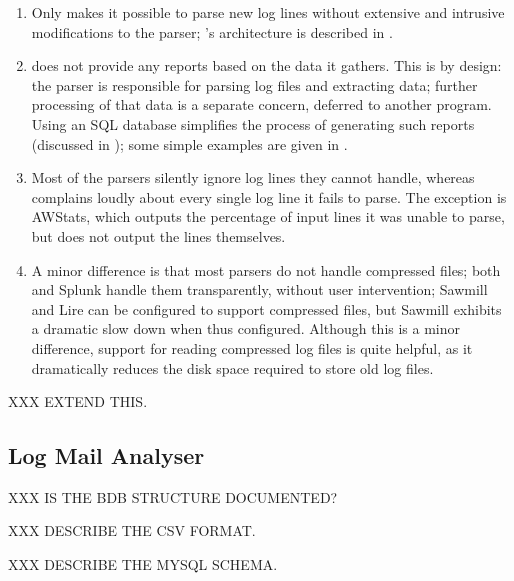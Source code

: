 \begin{enumerate}

    \item Only \parsername{} makes it possible to parse new log lines
        without extensive and intrusive modifications to the parser;
        \parsername{}'s architecture is described in .

    \item \parsername{} does not provide any reports based on the data it
        gathers.  This is by design: the parser is responsible for parsing
        log files and extracting data; further processing of that data is a
        separate concern, deferred to another program.  Using an \gls{SQL}
        database simplifies the process of generating such reports
        (discussed in ); some simple examples
        are given in .

    \item Most of the parsers silently ignore log lines they cannot handle,
        whereas \parsername{} complains loudly about every single log line
        it fails to parse.  The exception is AWStats, which outputs the
        percentage of input lines it was unable to parse, but does not
        output the lines themselves.

    \item A minor difference is that most parsers do not handle compressed
        files; both \parsername{} and Splunk handle them transparently,
        without user intervention; Sawmill and Lire can be configured to
        support compressed files, but Sawmill exhibits a dramatic slow down
        when thus configured.  Although this is a minor difference, support
        for reading compressed log files is quite helpful, as it
        dramatically reduces the disk space required to store old log
        files.

\end{enumerate}

XXX EXTEND THIS\@.

\subsection{Log Mail Analyser}

XXX IS THE BDB STRUCTURE DOCUMENTED\@?

XXX DESCRIBE THE \gls{CSV} FORMAT\@.

XXX DESCRIBE THE MYSQL SCHEMA\@.

